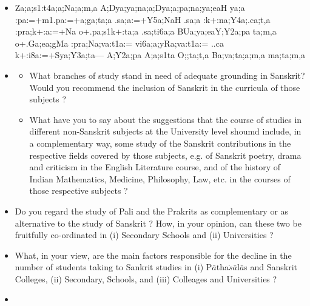 \begin{spacing}{1.15}
\begin{itemize}
\begin{itemize}
    \item[({\sktf ga})] {\sktf Za;a;s1:t4a;a;Na;a;m,a
A;Dya;ya;na;a;Dya;a;pa;na;ya;eaH ya;a :pa:=+m1.pa:=+a;ga;ta;a
.sa;a:=+Y5a;NaH\ZF{,} .sa;a :k+:na;Y4a;.ca;t,a
:pra;k+:a:=+Na o+.pa;s1k+:ta;a .sa;ti6a;a
BUa;ya;eaY;Y2a;pa ta;m,a o+.Ga;ea;gMa :pra;Na;va:t1a:=
vi6a;a;yRa;va:t1a:= ..ca k+:i8a:=+Sya;Y3a;ta}{\rm ---}{\sktf
A;Y2a;pa A;a;s1ta O;;ta;t,a Ba;va;ta;a;m,a ma;ta;m,a }
 \end{itemize}
 \end{itemize}
\end{spacing}

{\rm 
\begin{itemize}
\item[14] \begin{itemize}
                 \item[(a)] What branches of study stand in need of adequate grounding in Sanskrit? Would you recommend the inclusion of Sanskrit in the curricula of those subjects ?
                 
                 \item[(b)] What have you to say about the suggestions that the course of studies in different non-Sanskrit subjects at the University level shoumd include, in a complementary way, some study of the Sanskrit contributions in the respective fields covered by those subjects, e.g. of Sanskrit poetry, drama and criticism in the English Literature course, and of the history of Indian Mathematics, Medicine, Philosophy, Law, etc. in the courses of those respective subjects ?
              \end{itemize}        
              
    \item[15] Do you regard the study of Pali and the Prakrits as complementary or as alternative to the study of Sanskrit ? How, in your opinion, can these two be fruitfully co-ordinated in (i) Secondary Schools and (ii) Universities ?          
     
     \item[16] What, in your view, are the main factors responsible for the decline in the number of students taking to Sankrit studies in (i) P$\bar{a}$tha$\acute{s}\bar{a}$l$\bar{a}$s and Sanskrit Colleges, (ii) Secondary, Schools, and (iii) Colleages and Universities ?         
      
      \item[17] \begin{itemize}
                 

\end{itemize}
\end{itemize}}

